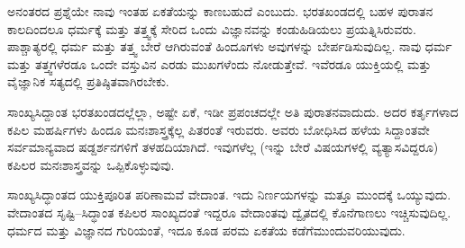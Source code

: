 ಅನಂತರದ ಪ್ರಶ್ನೆಯೇ ನಾವು ಇಂತಹ ಏಕತೆಯನ್ನು ಕಾಣಬಹುದೆ ಎಂಬುದು. ಭರತಖಂಡದಲ್ಲಿ ಬಹಳ ಪುರಾತನ ಕಾಲದಿಂದಲೂ ಧರ್ಮಕ್ಕೆ ಮತ್ತು ತತ್ತ್ವಕ್ಕೆ ಸೇರಿದ ಒಂದು ವಿಜ್ಞಾನವನ್ನು ಕಂಡುಹಿಡಿಯಲು ಪ್ರಯತ್ನಿಸಿರುವರು. ಪಾಶ್ಚಾತ್ಯರಲ್ಲಿ ಧರ್ಮ ಮತ್ತು ತತ್ತ್ವ ಬೇರೆ ಆಗಿರುವಂತೆ ಹಿಂದೂಗಳು ಅವುಗಳನ್ನು ಬೇರ್ಪಡಿಸುವುದಿಲ್ಲ. ನಾವು ಧರ್ಮ ಮತ್ತು ತತ್ತ್ವಗಳೆರಡೂ ಒಂದೇ ವಸ್ತುವಿನ ಎರಡು ಮುಖಗಳೆಂದು ನೋಡುತ್ತೇವೆ. ಇವೆರಡೂ ಯುಕ್ತಿಯಲ್ಲಿ ಮತ್ತು ವೈಜ್ಞಾನಿಕ ಸತ್ಯದಲ್ಲಿ ಪ್ರತಿಷ್ಠಿತವಾಗಿರಬೇಕು.

ಸಾಂಖ್ಯಸಿದ್ದಾಂತ ಭರತಖಂಡದಲ್ಲೆಲ್ಲಾ, ಅಷ್ಟೇ ಏಕೆ, ಇಡೀ ಪ್ರಪಂಚದಲ್ಲೇ ಅತಿ ಪುರಾತನವಾದುದು. ಅದರ ಕರ್ತೃಗಳಾದ ಕಪಿಲ ಮಹರ್ಷಿಗಳು ಹಿಂದೂ ಮನಃಶಾಸ್ತ್ರಕ್ಕೆಲ್ಲ ಪಿತರಂತೆ ಇರುವರು. ಅವರು ಬೋಧಿಸಿದ ಹಳೆಯ ಸಿದ್ದಾಂತವೇ ಸರ್ವಮಾನ್ಯವಾದ ಷಡ್ದರ್ಶನಗಳಿಗೆ ತಳಹದಿಯಾಗಿದೆ. ಇವುಗಳೆಲ್ಲ (ಇನ್ನು ಬೇರೆ ವಿಷಯಗಳಲ್ಲಿ ವ್ಯತ್ಯಾಸವಿದ್ದರೂ) ಕಪಿಲರ ಮನಃಶಾಸ್ತ್ರವನ್ನು ಒಪ್ಪಿಕೊಳ್ಳುವುವು.

ಸಾಂಖ್ಯಸಿದ್ಧಾಂತದ ಯುಕ್ತಿಪೂರಿತ ಪರಿಣಾಮವೆ ವೇದಾಂತ. ಇದು ನಿರ್ಣಯಗಳನ್ನು ಮತ್ತೂ ಮುಂದಕ್ಕೆ ಒಯ್ಯುವುದು. ವೇದಾಂತದ ಸೃಷ್ಟಿ–ಸಿದ್ಧಾಂತ  ಕಪಿಲರ ಸಾಂಖ್ಯದಂತೆ ಇದ್ದರೂ ವೇದಾಂತವು ದ್ವೈತದಲ್ಲಿ ಕೊನೆಗಾಣಲು ಇಚ್ಚಿಸುವುದಿಲ್ಲ. ಧರ್ಮದ ಮತ್ತು ವಿಜ್ಞಾನದ ಗುರಿಯಂತೆ, ಇದೂ ಕೂಡ ಪರಮ ಏಕತೆಯ ಕಡೆಗೆ\break ಮುಂದುವರಿಯುವುದು.

